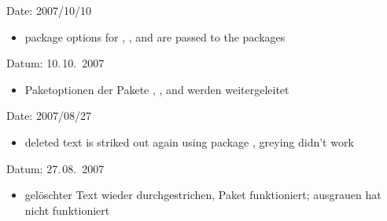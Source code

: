 
\ifENGLISH
Date: 2007/10/10
\begin{itemize}
\item package options for , , and  are passed to the packages
\end{itemize}
\fi
\ifGERMAN
	Datum: 10.\,10.~2007
	\begin{itemize}
	\item Paketoptionen der Pakete , , and  werden weitergeleitet
	\end{itemize}
\fi


\ifENGLISH
Date: 2007/08/27
\begin{itemize}
\item deleted text is striked out again using package , greying didn't work
\end{itemize}
\fi
\ifGERMAN
	Datum: 27.\,08.~2007
	\begin{itemize}
	\item gelöschter Text wieder durchgestrichen, Paket  funktioniert; ausgrauen hat nicht funktioniert
	\end{itemize}
\fi


